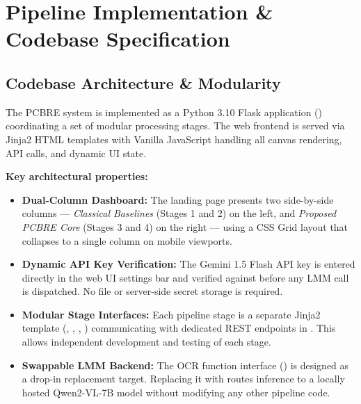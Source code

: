 \documentclass[12pt,a4paper]{report}
\begin{document}
\chapter{Pipeline Implementation \& Codebase Specification}
\label{chap:implementation}

\section{Codebase Architecture \& Modularity}
\label{sec:codebase}

The PCBRE system is implemented as a Python 3.10 Flask application () coordinating a set of modular processing stages. The web frontend is served via Jinja2 HTML templates with Vanilla JavaScript handling all canvas rendering, API calls, and dynamic UI state.

\textbf{Key architectural properties:}
\begin{itemize}
  \item \textbf{Dual-Column Dashboard:} The  landing page presents two side-by-side columns --- \textit{Classical Baselines} (Stages 1 and 2) on the left, and \textit{Proposed PCBRE Core} (Stages 3 and 4) on the right --- using a CSS Grid layout that collapses to a single column on mobile viewports.
  \item \textbf{Dynamic API Key Verification:} The Gemini 1.5 Flash API key is entered directly in the web UI settings bar and verified against  before any LMM call is dispatched. No  file or server-side secret storage is required.
  \item \textbf{Modular Stage Interfaces:} Each pipeline stage is a separate Jinja2 template (, , , ) communicating with dedicated REST endpoints in . This allows independent development and testing of each stage.
  \item \textbf{Swappable LMM Backend:} The OCR function interface () is designed as a drop-in replacement target. Replacing it with  routes inference to a locally hosted Qwen2-VL-7B model without modifying any other pipeline code.
\end{itemize}
\end{document}

